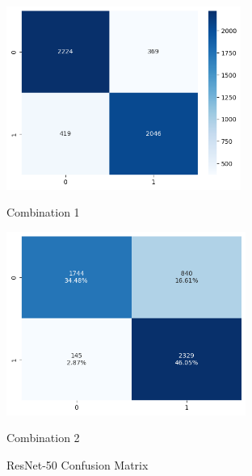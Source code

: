\begin{figure}[H]
    \centering
    \begin{minipage}[b]{0.49\textwidth}
        \centering
        \includegraphics[width=\textwidth, height=6cm]{Figures/balanced_data/more_data/withoutbn/resnet/cm.png}
        \captionsetup{labelformat=empty}
        \caption{Combination 1}
        \label{fig:u_wo_r_cm}
    \end{minipage}
    \hfill
    \begin{minipage}[b]{0.49\textwidth}
        \centering
        \includegraphics[width=\textwidth, height=6cm]{Figures/balanced_data/more_data/withbn/resnet/cm.png}
        \captionsetup{labelformat=empty}
        \caption{Combination 2}
        \label{fig:u_w_r_cm}
    \end{minipage}
    \captionsetup{labelformat=default}
    \caption{ResNet-50 Confusion Matrix}
\end{figure}


